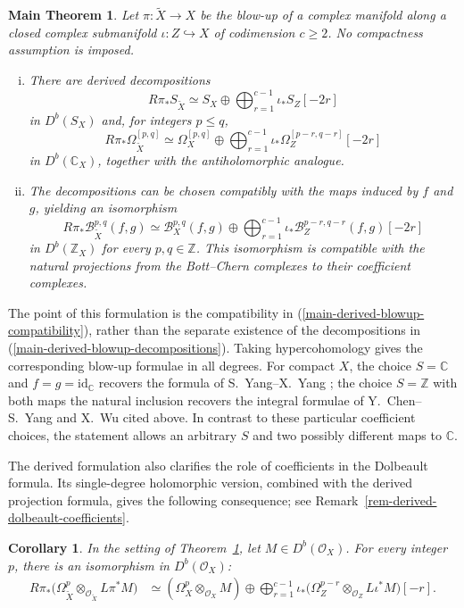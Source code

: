 \documentclass[11pt]{amsart}
\numberwithin{equation}{section}
\theoremstyle{plain}
\newtheorem{mthm}[thm]{Main Theorem}
\newtheorem{cor}[thm]{Corollary}
\theoremstyle{definition}
\begin{document}
\begin{mthm}\label{main-derived-blowup}
Let $\pi:\tilde{X}\longrightarrow X$ be the blow-up of a complex
manifold along a closed complex submanifold $\iota:Z\hookrightarrow X$
of codimension $c\geq2$.  No compactness assumption is imposed.
\begin{enumerate}[(i)]
\item\label{main-derived-blowup-decompositions} There are derived decompositions
\[
R\pi_*S_{\tilde{X}}\simeq S_X\oplus
\bigoplus_{r=1}^{c-1}\iota_*S_Z[-2r]
\]
in $D^b(S_X)$ and, for integers $p\leq q$,
\[
R\pi_*\Omega_{\tilde{X}}^{[p,q]}
\simeq\Omega_X^{[p,q]}\oplus
\bigoplus_{r=1}^{c-1}\iota_*\Omega_Z^{[p-r,q-r]}[-2r]
\]
in $D^b(\mathbb C_X)$, together with the antiholomorphic analogue.
\item\label{main-derived-blowup-compatibility} The decompositions can be chosen compatibly with the maps
induced by $f$ and $g$, yielding an isomorphism
\[
R\pi_*\mathcal B_{\tilde{X}}^{p,q}(f,g)
\simeq\mathcal B_X^{p,q}(f,g)\oplus
\bigoplus_{r=1}^{c-1}\iota_*\mathcal B_Z^{p-r,q-r}(f,g)[-2r]
\]
in $D^b(\mathbb Z_X)$ for every $p,q\in\mathbb Z$.
This isomorphism is compatible with the natural projections from the
Bott--Chern complexes to their coefficient complexes.
\end{enumerate}
\end{mthm}

The point of this formulation is the compatibility in
(\ref{main-derived-blowup-compatibility}), rather than the separate existence
of the decompositions in (\ref{main-derived-blowup-decompositions}).
Taking hypercohomology gives the corresponding blow-up formulae in all
degrees.  For compact $X$, the choice $S=\mathbb C$ and
$f=g=\mathrm{id}_{\mathbb C}$ recovers the formula of S.~Yang--X.~Yang
\cite[Theorem 3.7]{SY}; the choice $S=\mathbb Z$ with both maps the
natural inclusion recovers the integral formulae of Y.~Chen--S.~Yang and X.~Wu
cited above.  In contrast to these particular coefficient choices, the
statement allows an arbitrary $S$ and two possibly different maps to
$\mathbb C$.

The derived formulation also clarifies the role of coefficients in the
Dolbeault formula.  Its single-degree holomorphic version, combined
with the derived projection formula, gives the following consequence;
see Remark~\ref{rem-derived-dolbeault-coefficients}.

\begin{cor}\label{cor-main-derived-dolbeault}
In the setting of Theorem~\ref{main-derived-blowup}, let
$M\in D^b(\mathcal O_X)$.  For every integer $p$, there is an
isomorphism in $D^b(\mathcal O_X)$:
\[
\begin{aligned}
R\pi_*\bigl(\Omega_{\tilde{X}}^p
\otimes_{\mathcal O_{\tilde{X}}}L\pi^*M\bigr)
&\simeq (\Omega_X^p\otimes_{\mathcal O_X}M)
\oplus\bigoplus_{r=1}^{c-1}
\iota_*\bigl(\Omega_Z^{p-r}\otimes_{\mathcal O_Z}L\iota^*M\bigr)[-r].
\end{aligned}
\]
\end{cor}
\end{document}
